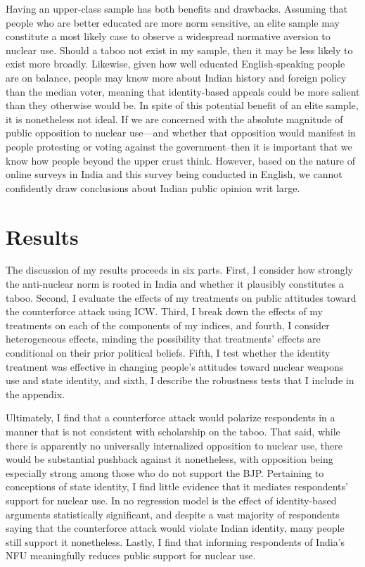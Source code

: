 \documentclass[12pt]{article}
\begin{document}
Having an upper-class sample has both benefits and drawbacks. Assuming that people who are better educated are more norm sensitive, an elite sample may constitute a most likely case to observe a widespread normative aversion to nuclear use. Should a taboo not exist in my sample, then it may be less likely to exist more broadly. Likewise, given how well educated English-speaking people are on balance, people may know more about Indian history and foreign policy than the median voter, meaning that identity-based appeals could be more salient than they otherwise would be. In spite of this potential benefit of an elite sample, it is nonetheless not ideal. If we are concerned with the absolute magnitude of public opposition to nuclear use—and whether that opposition would manifest in people protesting or voting against the government–then it is important that we know how people beyond the upper crust think. However, based on the nature of online surveys in India and this survey being conducted in English, we cannot confidently draw conclusions about Indian public opinion writ large.

\section{Results}
The discussion of my results proceeds in six parts. First, I consider how strongly the anti-nuclear norm is rooted in India and whether it plausibly constitutes a taboo. Second, I evaluate the effects of my treatments on public attitudes toward the counterforce attack using ICW. Third, I break down the effects of my treatments on each of the components of my indices, and fourth, I consider heterogeneous effects, minding the possibility that treatments' effects are conditional on their prior political beliefs. Fifth, I test whether the identity treatment was effective in changing people's attitudes toward nuclear weapons use and state identity, and sixth, I describe the robustness tests that I include in the appendix.

Ultimately, I find that a counterforce attack would polarize respondents in a manner that is not consistent with scholarship on the taboo. That said, while there is apparently no universally internalized opposition to nuclear use, there would be substantial pushback against it nonetheless, with opposition being especially strong among those who do not support the BJP. Pertaining to conceptions of state identity, I find little evidence that it mediates respondents' support for nuclear use. In no regression model is the effect of identity-based arguments statistically significant, and despite a vast majority of respondents saying that the counterforce attack would violate Indian identity, many people still support it nonetheless. Lastly, I find that informing respondents of India's NFU meaningfully reduces public support for nuclear use. 
\end{document}
